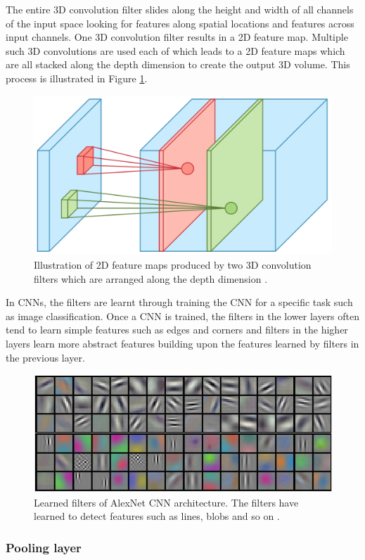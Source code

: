 The entire 3D convolution filter slides along the height and width of all channels of the input space looking for features along spatial locations and features across input channels. One 3D convolution filter results in a 2D feature map. Multiple such 3D convolutions are used each of which leads to a 2D feature maps which are all stacked along the depth dimension to create the output 3D volume. This process is illustrated in Figure \ref{Fig:3dconv}.

	\begin{figure}[h]
		\centering
		\includegraphics[width=.3\linewidth]{images/3d_conv}
		\caption{Illustration of 2D feature maps produced by two 3D convolution filters which are arranged along the depth dimension  \cite{towardsdatascience}.}
		\label{Fig:3dconv}
	\end{figure}
	
In CNNs, the filters are learnt through training the CNN for a specific task such as image classification. Once a CNN is trained, the filters in the lower layers often tend to learn simple features such as edges and corners and filters in the higher layers learn more abstract features building upon the features learned by filters in the previous layer. 

	\begin{figure}[h]
		\centering
		\includegraphics[width=.8\linewidth]{images/conv_template}
		\caption{Learned filters of AlexNet CNN architecture. The filters have learned to detect features such as lines, blobs and so on \cite{cs231n}.}
		\label{Fig:conv_template}
	\end{figure}
	

\subsubsection{Pooling layer}

